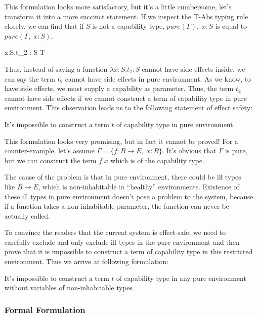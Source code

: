 This formulation looks more satisfactory, but it's a little
cumbersome, let's transform it into a more succinct statement. If we
inspect the T-Abs typing rule closely, we can find that if \emph{S} is
not a capability type, $pure(\Gamma),\; x: S$ is equal to
$pure(\Gamma,\; x: S)$.

{ \Gamma \vdash \lambda x:S.\;t_2 : S \to T }

Thus, instead of saying a function $\lambda x:S.t_2 : S$ cannot have
side effects inside, we can say the term $t_2$ cannot have side
effects in pure environment. As we know, to have side effects, we must
supply a capability as parameter. Thus, the term $t_2$ cannot have
side effects if we cannot construct a term of capability type in pure
environment. This observation leads us to the following statement of
effect safety:

\begin{definition}
 It's impossible to construct a term $t$ of capability type in pure environment.
\end{definition}

This formulation looks very promising, but in fact it cannot be proved!
For a counter-example, let's assume $\Gamma = \{f: B \to E, \; x:
B\}$. It's obvious that $\Gamma$ is pure, but we can construct the
term $f \; x$ which is of the capability type.

The cause of the problem is that in pure environment, there could be
ill types like $B \to E$, which is non-inhabitable in ``healthy''
environments.  Existence of these ill types in pure environment
doesn't pose a problem to the system, because if a function takes a
non-inhabitable parameter, the function can never be actually called.

To convince the readers that the current system is effect-safe, we
need to carefully exclude and only exclude ill types in the pure
environment and then prove that it is impossible to construct a term
of capability type in this restricted environment. Thus we arrive at
following formulation:

\begin{definition}
  It's impossible to construct a term $t$ of capability type in any
  pure environment without variables of non-inhabitable types.
\end{definition}

\subsubsection{Formal Formulation}

